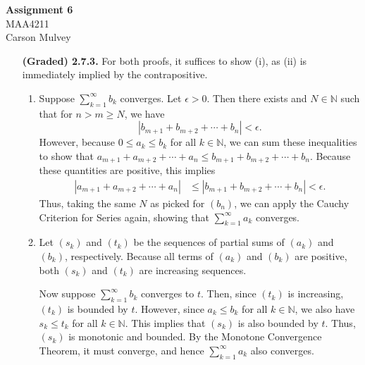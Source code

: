 \documentclass[11pt,letterpaper]{article}
\newcommand{\N}{\mathbb{N}}
\begin{document}
\begin{center}
    \begin{large}
        \textbf{Assignment 6} \\
        MAA4211 \\
        Carson Mulvey
    \end{large}
\end{center}

\begin{enumerate}
    \item[\textbf{(Graded) 2.7.3.}]
    For both proofs, it suffices to show (i), as (ii) is immediately implied by the contrapositive.
    \begin{enumerate}
        \item Suppose $\sum_{k=1}^\infty b_k$ converges. Let $\epsilon > 0$. Then there exists and $N \in \N$ such that for $n>m \geq N$, we have
        \[
            |b_{m+1} + b_{m+2} + \cdots + b_n| < \epsilon.
        \]
        However, because $0 \leq a_k \leq b_k$ for all $k \in \N$, we can sum these inequalities to show that $a_{m+1}+a_{m+2}+\cdots + a_n \leq b_{m+1} + b_{m+2} + \cdots + b_n$. Because these quantities are positive, this implies
        \begin{align*}
            |a_{m+1}+a_{m+2}+\cdots + a_n| &\leq |b_{m+1} + b_{m+2} + \cdots + b_n| < \epsilon.
        \end{align*}
        Thus, taking the same $N$ as picked for $(b_n)$, we can apply the Cauchy Criterion for Series again, showing that $\sum_{k=1}^\infty a_k$ converges.

        \item Let $(s_k)$ and $(t_k)$ be the sequences of partial sums of $(a_k)$ and $(b_k)$, respectively. Because all terms of $(a_k)$ and $(b_k)$ are positive, both $(s_k)$ and $(t_k)$ are increasing sequences.
        
        Now suppose $\sum_{k=1}^\infty b_k$ converges to $t$. Then, since $(t_k)$ is increasing, $(t_k)$ is bounded by $t$. However, since $a_k\leq b_k$ for all $k\in \N$, we also have $s_k \leq t_k$ for all $k \in \N$. This implies that $(s_k)$ is also bounded by $t$. Thus, $(s_k)$ is monotonic and bounded. By the Monotone Convergence Theorem, it must converge, and hence $\sum_{k=1}^\infty a_k$ also converges.
    \end{enumerate}

\end{enumerate}
\end{document}
